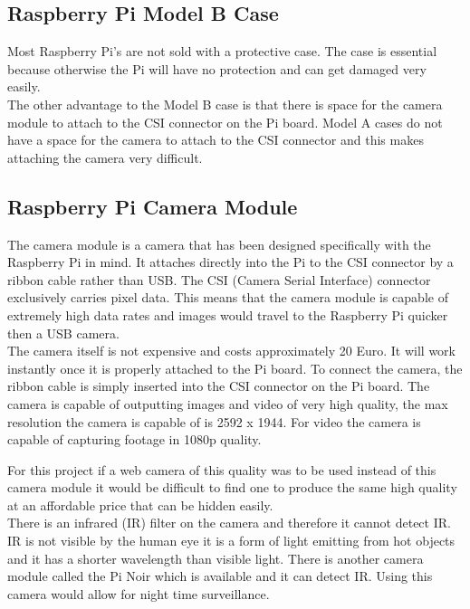 \documentclass[12pt]{report}
\begin{document}
\subsection{Raspberry Pi Model B Case}
\label{subsec:raspberrypicase}
Most Raspberry Pi's are not sold with a protective case. The case is essential because otherwise the Pi will have no protection and can get damaged very easily. \\ 

The other advantage to the Model B case is that there is space for the camera module to attach to the CSI connector on the Pi board. Model A cases do not have a space for the camera to attach to the CSI connector and this makes attaching the camera very difficult.\\


\noindent
\subsection{Raspberry Pi Camera Module}
\label{subsec:raspberrypicammod}
The camera module is a camera that has been designed specifically with the Raspberry Pi in mind. It attaches directly into the Pi to the CSI connector by a ribbon cable rather than USB. The CSI (Camera Serial Interface) connector exclusively carries pixel data. This means that the camera module is capable of extremely high data rates and images would travel to the Raspberry Pi quicker then a USB camera.\\

The camera itself is not expensive and costs approximately 20 Euro. It will work instantly once it is properly attached to the Pi board. To connect the camera, the ribbon cable is simply inserted into the CSI connector on the Pi board. The camera is capable of outputting images and video of very high quality, the max resolution the camera is capable of is 2592 x 1944. For video the camera is capable of capturing footage in 1080p quality. 

For this project if a web camera of this quality was to be used instead of this camera module it would be difficult to find one to produce the same high quality at an affordable price that can be hidden easily.\\

There is an infrared (IR) filter on the camera and therefore it cannot detect IR. IR is not visible by the human eye it is a form of light emitting from hot objects and it has a shorter wavelength than visible light. There is another camera module called the Pi Noir which is available and it can detect IR. Using this camera would allow for night time surveillance.\\ 
\end{document}
